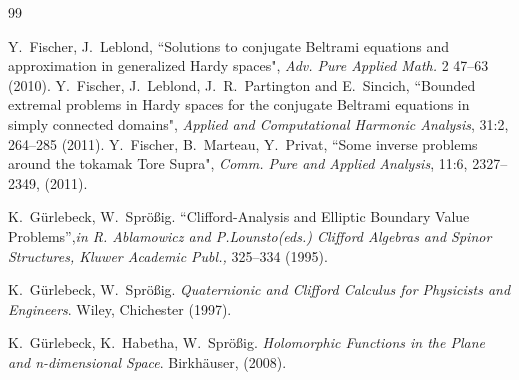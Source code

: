 \documentclass[12pt]{article}
\begin{document}
\begin{thebibliography}{99}



Y.~Fischer, J.~Leblond, ``Solutions to conjugate Beltrami equations and approximation in generalized Hardy spaces", {\em Adv. Pure Applied Math.} 2 47--63 (2010).
Y.~Fischer, J.~Leblond, J.~R.~Partington and E.~Sincich, ``Bounded extremal problems in Hardy spaces for the conjugate Beltrami equations in simply connected domains", {\em Applied and Computational Harmonic Analysis}, 31:2, 264--285 (2011).
Y.~Fischer, B.~Marteau, Y.~Privat, ``Some inverse problems around the tokamak Tore Supra", {\em Comm. Pure and Applied Analysis}, 11:6, 2327--2349, (2011).

 K.~G\"{u}rlebeck, W.~Spr\"{o}\ss{}ig. ``Clifford-Analysis and Elliptic Boundary Value Problems'',{\em in R. Ablamowicz and P.Lounsto(eds.) Clifford Algebras and Spinor Structures, Kluwer Academic Publ.,} 325--334 (1995).	

 K.~G\"{u}rlebeck, W.~Spr\"{o}\ss{}ig. {\em Quaternionic and Clifford Calculus for Physicists and Engineers}. Wiley, Chichester (1997).

K.~G\"{u}rlebeck, K.~Habetha, W.~Spr\"{o}\ss{}ig.  
{\em Holomorphic Functions in the Plane and
  n-dimensional Space}.  Birkh\"{a}user, (2008).

		




\end{thebibliography}
\end{document}
